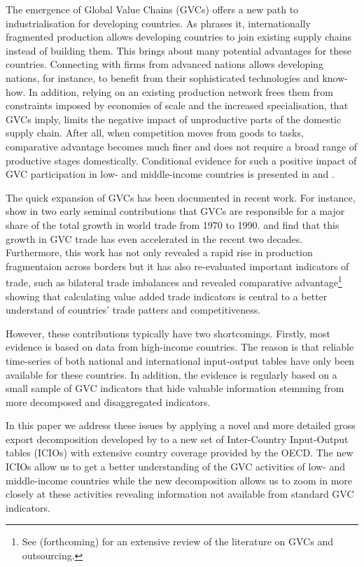 \documentclass[11pt,a4paper]{article}
\begin{document}
The emergence of Global Value Chains (GVCs) offers a new path to industrialisation for developing countries. As \cite{riba12} phrases it, internationally fragmented production allows developing countries to join existing supply chains instead of building them. This brings about many potential advantages for these countries. Connecting with firms from advanced nations allows developing nations, for instance, to benefit from their sophisticated technologies and know-how. In addition, relying on an existing production network frees them from constraints imposed by economies of scale and the increased specialisation, that GVCs imply, limits the negative impact of unproductive parts of the domestic supply chain. After all, when competition moves from goods to tasks, comparative advantage becomes much finer and does not require a broad range of productive stages domestically. Conditional evidence for such a positive impact of GVC participation in low- and middle-income countries is presented in \citet{viku15} and \citet{unct13}.

The quick expansion of GVCs has been documented in recent work. For instance, \citet{dahuetal98, dahuetal01} show in two early seminal contributions that GVCs are responsible for a major share of the total growth in world trade from 1970 to 1990. \citet{rojoguno12} and \citet{ribajalo13} find that this growth in GVC trade has even accelerated in the recent two decades. Furthermore, this work has not only revealed a rapid rise in production fragmentaion across borders but it has also re-evaluated important indicators of trade, such as bilateral trade imbalances and revealed comparative advantage\footnote{See \citeauthor{joamsoca15} (forthcoming) for an extensive review of the literature on GVCs and outsourcing.} showing that calculating value added trade indicators is central to a better understand of countries' trade patters and competitiveness. 

However, these contributions typically have two shortcomings. Firstly, most evidence is based on data from high-income countries. The reason is that reliable time-series of both national and international input-output tables have only been available for these countries. In addition, the evidence is regularly based on a small sample of GVC indicators that hide valuable information stemming from more decomposed and disaggregated indicators. 

In this paper we address these issues by applying a novel and more detailed gross export decomposition developed by \citet{zhwaetal13} to a new set of Inter-Country Input-Output tables (ICIOs) with extensive country coverage provided by the OECD. The new ICIOs allow us to get a better understanding of the GVC activities of low- and middle-income countries while the new decomposition allows us to zoom in more closely at these activities revealing information not available from standard GVC indicators.
\end{document}
